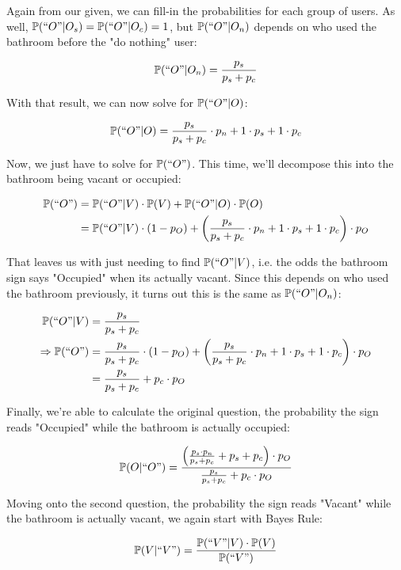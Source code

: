 \documentclass[12 pt]{article}
\begin{document}
\begin{flushleft}
Again from our given, we can fill-in the probabilities for each group of users. As well, $\mathbb{P}(``O"|O_s) = \mathbb{P}(``O"|O_c) = 1$, but $\mathbb{P}(``O"|O_n)$ depends on who used the bathroom before the "do nothing" user:

$$ \mathbb{P}(``O"|O_n) = \frac{p_s}{p_s + p_c} $$

With that result, we can now solve for $\mathbb{P}(``O"|O)$:

$$ \mathbb{P}(``O"|O) = \frac{p_s}{p_s + p_c} \cdot p_n + 1 \cdot p_s + 1 \cdot p_c $$

Now, we just have to solve for $\mathbb{P}(``O")$. This time, we'll decompose this into the bathroom being vacant or occupied:

\begin{align}
\mathbb{P}(``O") &= \mathbb{P}(``O"|V) \cdot \mathbb{P}(V) + \mathbb{P}(``O"|O) \cdot \mathbb{P}(O) \notag \\
&= \mathbb{P}(``O"|V) \cdot (1 - p_O) + \left(\frac{p_s}{p_s + p_c} \cdot p_n + 1 \cdot p_s + 1 \cdot p_c \right) \cdot p_O \notag
\end{align}

That leaves us with just needing to find $\mathbb{P}(``O"|V)$, i.e. the odds the bathroom sign says "Occupied" when its actually vacant. Since this depends on who used the bathroom previously, it turns out this is the same as $\mathbb{P}(``O"|O_n)$:

\begin{align}
\mathbb{P}(``O"|V) &= \frac{p_s}{p_s + p_c} \notag \\
\Rightarrow \mathbb{P}(``O") &= \frac{p_s}{p_s + p_c} \cdot (1 - p_O) + \left(\frac{p_s}{p_s + p_c} \cdot p_n + 1 \cdot p_s + 1 \cdot p_c \right) \cdot p_O \notag \\
&= \frac{p_s}{p_s + p_c} + p_c \cdot p_O \notag
\end{align}

Finally, we're able to calculate the original question, the probability the sign reads "Occupied" while the bathroom is actually occupied:

$$ \mathbb{P}(O|``O") =  \frac{ \left( \frac{p_s \cdot p_n}{p_s + p_c} + p_s + p_c \right) \cdot p_O}{\frac{p_s}{p_s + p_c} + p_c \cdot p_O} $$

Moving onto the second question, the probability the sign reads "Vacant" while the bathroom is actually vacant, we again start with Bayes Rule:

$$ \mathbb{P}(V|``V") = \frac{\mathbb{P}(``V"|V) \cdot \mathbb{P}(V)}{\mathbb{P}(``V")} $$


\end{flushleft}
\end{document}
